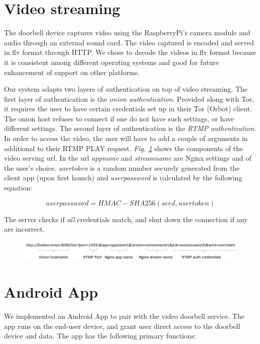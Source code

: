 \section{Video streaming}
The doorbell device captures video using the RaspberryPi's camera module and audio through an external sound card. The video captured is encoded and served in flv format through HTTP. We chose to decode the videos in flv format because it is consistent among different operating systems and good for future enhancement of support on other platforms. 

Our system adapts two layers of authentication on top of video streaming. The first layer of authentication is the \textit{onion authentication}. Provided along with Tor, it requires the user to have certain credentials set up in their Tor (Orbot) client. The onion host refuses to connect if one do not have such settings, or have different settings. The second layer of authentication is the \textit{RTMP authentication}. In order to access the video, the user will have to add a couple of arguments in additional to their RTMP PLAY request. \textit{Fig. \ref{fig:url}} shows the components of the video serving url. In the url \textit{appname} and \textit{streamname} are Nginx settings and of the user's choice. \textit{usertoken} is a random number securely generated from the client app (upon first launch) and \textit{userpassword} is calculated by the following equation:

\[
userpassword = HMAC-SHA256(seed, usertoken)
\]

The server checks if \textit{all} credentials match, and shut down the connection if any are incorrect.

\begin{figure}
	\includegraphics[width=\linewidth]{fig_url.jpg}
	\caption{}
	\label{fig:url}
\end{figure}



\section{Android App}
We implemented an Android App to pair with the video doorbell service. The app runs on the end-user device, and grant user direct access to the doorbell device and data. The app has the following primary functions:

